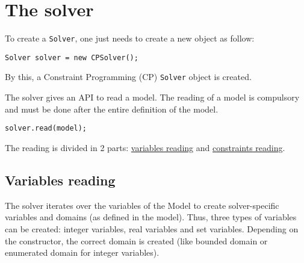 \label{solver}
\hypertarget{solver}{}


\chapter{The solver}\label{solver:thesolver}\hypertarget{solver:thesolver}{}


To create a {\tt Solver}, one just needs to create a new object as follow:
\begin{lstlisting}
Solver solver = new CPSolver();
\end{lstlisting}
By this, a Constraint Programming (CP) {\tt Solver} object is created. 

The solver gives an API to read a model. The reading of a model is compulsory and must be done after the entire definition of the model. 
\begin{lstlisting}
solver.read(model);
\end{lstlisting}
The reading is divided in 2 parts: \hyperlink{solver:variablesreading}{variables reading} and \hyperlink{solver:constraintsreading}{constraints reading}.

\section{Variables reading}\label{solver:variablesreading}\hypertarget{solver:variablesreading}{}
The solver iterates over the variables of the Model to create solver-specific variables and domains (as defined in the model). 
Thus, three types of variables can be created: integer variables, real variables and set variables. 
Depending on the constructor, the correct domain is created (like bounded domain or enumerated domain for integer variables). 

